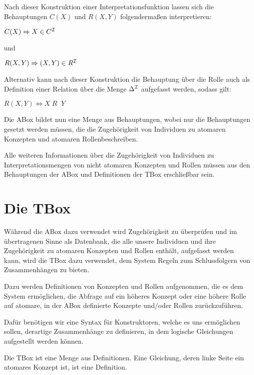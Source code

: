 \documentclass[runningheads,a4paper]{llncs}
\begin{document}
Nach dieser Konstruktion einer Interpretationsfunktion lassen sich die Behauptungen $C(X)$ und $R(X,Y)$ folgendermaßen interpretieren:

	\begin{center}
	$C(X)\Rightarrow X\in C^{\cal I}$
	\end{center}

und

	\begin{center}
	$R(X,Y)\Rightarrow (X,Y)\in R^{\cal I}$
	\end{center}

Alternativ kann nach dieser Konstruktion die Behauptung über die Rolle auch als Definition einer Relation über die Menge $\Delta^{\cal I}$ aufgefasst werden, sodass gilt:


	\begin{center}
	$R(X,Y)\Leftrightarrow X \;R\;\; Y$
	\end{center}

Die ABox bildet nun  eine Menge aus Behauptungen, wobei nur die Behauptungen gesetzt werden müssen, die die Zugehörigkeit von Individuen zu atomaren Konzepten und atomaren Rollenbeschreiben. 

Alle weiteren Informationen über die Zugehörigkeit von Individuen zu Interpretationsmengen von nicht atomaren Konzepten und Rollen müssen aus den Behauptungen der ABox und Definitionen der TBox erschließbar sein. 


\section{Die TBox}

Während die ABox dazu verwendet wird Zugehörigkeit zu überprüfen und im übertragenen Sinne als Datenbank, die alle unsere Individuen und ihre Zugehörigkeit zu atomaren Konzepten und Rollen enthält, aufgefasst werden kann, wird die TBox dazu verwendet, dem System Regeln zum Schlussfolgern  von Zusammenhängen  zu bieten.

Dazu werden Definitionen von Konzepten und Rollen aufgenommen, die es dem System ermöglichen, die Abfrage auf ein höheres Konzept oder eine höhere Rolle auf atomare, in der ABox definierte Konzepte und/oder Rollen zurückzuführen.

 Dafür benötigen wir eine Syntax für  Konstruktoren, welche es uns ermöglichen sollen, derartige Zusammenhänge zu definieren, in dem logische Gleichungen aufgestellt werden können.

Die TBox ist eine Menge aus Definitionen. Eine Gleichung, deren linke Seite ein atomares Konzept ist, ist eine Definition. 
\end{document}

